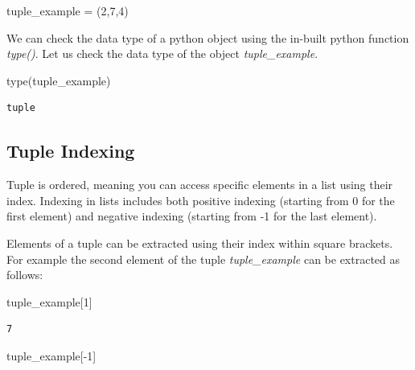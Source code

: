\documentclass[
  letterpaper,
  DIV=11,
  numbers=noendperiod]{scrreprt}
\newenvironment{Shaded}{\begin{snugshade}}{\end{snugshade}}
\newcommand{\BuiltInTok}[1]{\textcolor[rgb]{0.00,0.23,0.31}{#1}}
\newcommand{\DecValTok}[1]{\textcolor[rgb]{0.68,0.00,0.00}{#1}}
\newcommand{\NormalTok}[1]{\textcolor[rgb]{0.00,0.23,0.31}{#1}}
\newcommand{\OperatorTok}[1]{\textcolor[rgb]{0.37,0.37,0.37}{#1}}
\begin{document}
\begin{Shaded}
\begin{Highlighting}[]
\NormalTok{tuple\_example }\OperatorTok{=}\NormalTok{ (}\DecValTok{2}\NormalTok{,}\DecValTok{7}\NormalTok{,}\DecValTok{4}\NormalTok{)}
\end{Highlighting}
\end{Shaded}

We can check the data type of a python object using the in-built python
function \emph{type()}. Let us check the data type of the object
\emph{tuple\_example}.

\begin{Shaded}
\begin{Highlighting}[]
\BuiltInTok{type}\NormalTok{(tuple\_example)}
\end{Highlighting}
\end{Shaded}

\begin{verbatim}
tuple
\end{verbatim}

\hypertarget{tuple-indexing}{%
\subsection{Tuple Indexing}\label{tuple-indexing}}

Tuple is ordered, meaning you can access specific elements in a list
using their index. Indexing in lists includes both positive indexing
(starting from 0 for the first element) and negative indexing (starting
from -1 for the last element).

Elements of a tuple can be extracted using their index within square
brackets. For example the second element of the tuple
\emph{tuple\_example} can be extracted as follows:

\begin{Shaded}
\begin{Highlighting}[]
\NormalTok{tuple\_example[}\DecValTok{1}\NormalTok{]}
\end{Highlighting}
\end{Shaded}

\begin{verbatim}
7
\end{verbatim}

\begin{Shaded}
\begin{Highlighting}[]
\NormalTok{tuple\_example[}\OperatorTok{{-}}\DecValTok{1}\NormalTok{]}
\end{Highlighting}
\end{Shaded}
\end{document}
